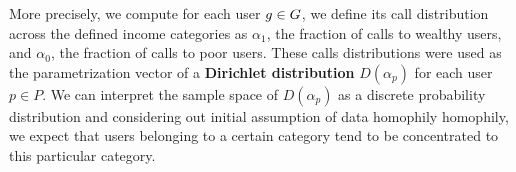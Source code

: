 More precisely, we compute for each user $ g \in \mathlarger{G} $, we define its call distribution across the defined income categories as $ \alpha_1 $, the fraction of calls to wealthy users, and $ \alpha_0 $, the fraction of calls to poor users. These calls distributions were used as the parametrization vector of a \textbf{Dirichlet distribution} $D(\alpha_p)$ for each user $ p \in P $. We can interpret the sample space of $ D(\alpha_p) $ as a discrete probability distribution and considering out initial assumption of data homophily homophily, we expect that users belonging to a certain category tend to be concentrated to this particular category.
